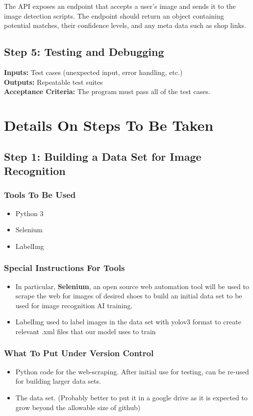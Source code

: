 \documentclass[12pt, titlepage]{article}
\begin{document}
The API exposes an endpoint that accepts a user's image and sends it to the image detection scripts. The endpoint should return an object containing potential matches, their confidence levels, and any meta data such as shop links.

\subsection{Step 5: Testing and Debugging}
\textbf{Inputs: }
Test cases (unexpected input, error handling, etc.) \\
\textbf{Outputs: }
Repeatable test suites \\
\textbf{Acceptance Criteria: }
The program must pass all of the test cases.


\section{Details On Steps To Be Taken}
\subsection{Step 1: Building a Data Set for Image Recognition}
\subsubsection*{Tools To Be Used}
\begin{itemize}
    \item Python 3
    \item Selenium
    \item LabelImg
\end{itemize}

\subsubsection*{Special Instructions For Tools}
\begin{itemize}
        \item In particular, \textbf{Selenium}, an open source web automation tool will be used to scrape the web for images of desired shoes to build an initial data set to be used for image recognition AI training.
        \item LabelImg used to label images in the data set with yolov3 format to create relevant .xml files that our model uses to train
\end{itemize}
\subsubsection*{What To Put Under Version Control}
\begin{itemize}
    \item Python code for the web-scraping. After initial use for testing, can be re-used for building larger data sets.
    \item The data set. (Probably better to put it in a google drive as it is expected to grow beyond the allowable size of github)
\end{itemize}
\end{document}
